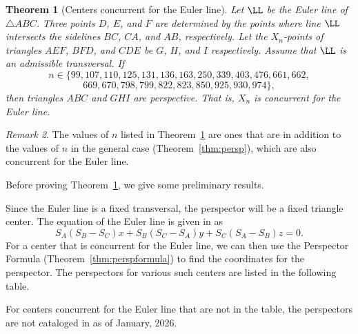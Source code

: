 \documentclass[12pt,a4paper]{amsart}
\newtheorem{theorem}{Theorem} [section]
\theoremstyle{remark}
\newtheorem{remark}[theorem]{Remark}
\begin{document}
\begin{theorem}[Centers concurrent for the Euler line]
\label{thm:Euler}
Let $\LL$ be the Euler line of $\triangle ABC$.
Three points $D$, $E$, and $F$ are determined by the points
where line $\LL$ intersects the sidelines $BC$, $CA$, and $AB$, respectively.
Let the $X_n$-points of triangles $AEF$, $BFD$, and $CDE$ be $G$, $H$, and $I$ respectively.
Assume that $\LL$ is an admissible transversal.
If
$$n\in\{99, 107, 110, 125, 131, 136, 163, 250, 339, 403, 476, 661, 662,$$
$$669, 670, 798, 799, 822, 823, 850, 925, 930, 974\},$$
then triangles $ABC$ and $GHI$ are perspective.
That is, $X_n$ is concurrent for the Euler line.
\end{theorem}

\begin{remark}
The values of $n$ listed in Theorem~\ref{thm:Euler} are ones that are in addition to the values of $n$
in the general case (Theorem~\ref{thm:persp}), which are also concurrent for the Euler line.
\end{remark}

Before proving Theorem~\ref{thm:Euler}, we give some preliminary results.

Since the Euler line is a fixed transversal, the perspector will be a fixed triangle center.
The equation of the Euler line is given in \cite[\S11.4.4]{Yiu} as
$$S_A(S_B-S_C)x+S_B(S_C-S_A)y+S_C(S_A-S_B)z=0.$$
For a center that is concurrent for the Euler line, we can then use the Perspector Formula
(Theorem~\ref{thm:perspformula}) to find the coordinates for the perspector.
The perspectors for various such centers are listed in the following table.

For centers concurrent for the Euler line that are not in the table,
the perspectors are not cataloged in \cite{ETC} as of January, 2026.


\newpage
\end{document}

